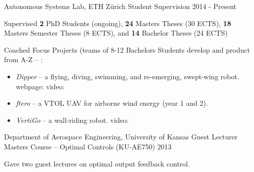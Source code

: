 \begin{cventries}
\cvteachentry
  	{Autonomous Systems Lab, ETH Z\"{u}rich} %
  	{Student Supervision} %
    {} %
    {2014 - Present} %
    {
      \begin{cvitems} %
        \item Supervised \textbf{2} PhD Students (ongoing), \textbf{24} Masters Theses (30 ECTS), \textbf{18} Masters Semester Theses (8 ECTS), and \textbf{14} Bachelor Theses (24 ECTS)
		\item Coached Focus Projects (teams of 8-12 Bachelors Students develop and product from A-Z -- :
		\begin{itemize}[label=-]
			\item \emph{Dipper} -- a flying, diving, swimming, and re-emerging, swept-wing robot.\\ webpage:  video: 
			\item \emph{ftero} -- a VTOL UAV for airborne wind energy (year 1 and 2). 
			\item \emph{VertiGo} -- a wall-riding robot. video: 	
		\end{itemize}
      \end{cvitems}
    } %
    {} %
    {\showprojectdescriptions}
    
\cvteachentry
  	{Department of Aerospace Engineering, University of Kansas} %
  	{Guest Lecturer} %
    {Masters Course -- Optimal Controls (KU-AE750)} %
    {2013} %
    {
      \begin{cvitems} %
        \item Gave two guest lectures on optimal output feedback control. %
      \end{cvitems}
    } %
    {} %
    {\showteachingdescriptions}


\end{cventries}
